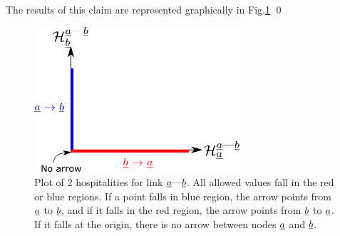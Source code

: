 \documentclass[12pt]{article}
\newcommand{\linkab }[0]{{\rva\text{---}\rvb}}
\begin{document}
The results of this claim
are represented graphically in 
Fig.\ref{fig-hospitalities-x-y}
\qed
\begin{figure}[h!]
\centering
\includegraphics[width=3in]
{hospitalities-x-y.png}
\caption{Plot of 2 hospitalities 
for link $\linkab$.
All allowed values 
fall in the
red or blue regions.
If a point falls in
blue region, the arrow 
points from ${\underline{a}}$ to ${\underline{b}}$,
and if it falls in the red region,
the arrow points from ${\underline{b}}$ to ${\underline{a}}$.
If it falls at the origin,
there is no arrow between 
nodes ${\underline{a}}$ and ${\underline{b}}$. }
\label{fig-hospitalities-x-y}
\end{figure}




\end{document}
